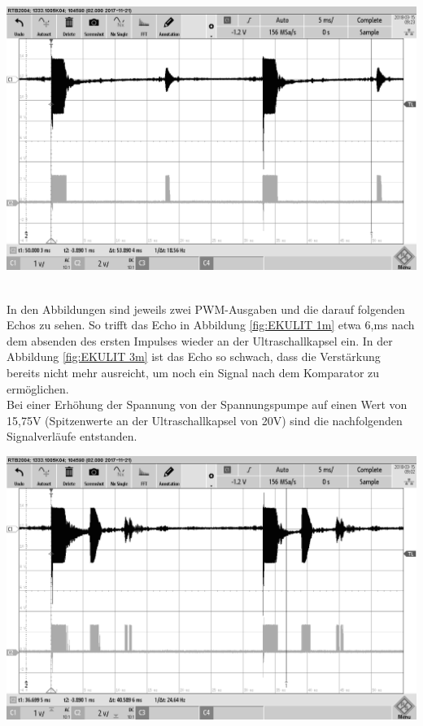 \begin{minipage}{0.5\textwidth}
\includegraphics[width=1\textwidth%
]{Abbildungen/MessungenP2/10V/3m.png}
\label{fig:EKULIT 3m}
\end{minipage}\\
In den Abbildungen sind jeweils zwei PWM-Ausgaben und die darauf folgenden Echos zu sehen. So trifft das Echo in Abbildung \ref{fig:EKULIT 1m} etwa 6,ms nach dem absenden des ersten Impulses  wieder an der Ultraschallkapsel ein. In der Abbildung \ref{fig:EKULIT 3m} ist das Echo so schwach, dass die Verstärkung bereits nicht mehr ausreicht, um noch ein Signal nach dem Komparator zu ermöglichen.\\
Bei einer Erhöhung der Spannung von der Spannungspumpe auf einen Wert von 15,75V (Spitzenwerte an der Ultraschallkapsel von 20V) sind die nachfolgenden Signalverläufe entstanden.\\
\begin{minipage}{0.5\textwidth}
\includegraphics[width=1\textwidth%
]{Abbildungen/MessungenP2/15V/1m.png}
\label{fig:EKULIT2 1m}
\end{minipage}
